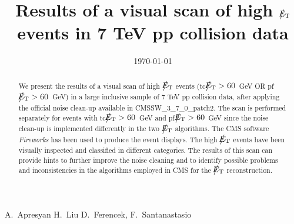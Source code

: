 \documentclass{cmspaper}
\def\etmiss{\big\slash\hspace{-1.6ex}{E_\text{T}}}
\begin{document}
\begin{linenumbers}


\begin{titlepage}


   \date{\today}

  \title{Results of a visual scan of high $\etmiss$ events in 7 TeV pp collision data}

  \begin{Authlist}
    A.~Apresyan
    H.~Liu
    D.~Ferencek, F.~Santanastasio %
  \end{Authlist}



  \begin{abstract}    
   We present the results of a visual scan of high $\etmiss$ events 
   (tc$\etmiss>60$~GeV OR pf$\etmiss>60$~GeV)
   in a large inclusive sample of 7 TeV pp collision data, 
   after applying the official noise clean-up available in CMSSW\_3\_7\_0\_patch2. 
   The scan is performed separately for events with tc$\etmiss>60$~GeV and pf$\etmiss>60$~GeV
   since the noise clean-up is implemented differently in the two $\etmiss$ algorithms.
   The CMS software {\it Fireworks} has been used to produce the event displays. 
   The high $\etmiss$ events have been visually inspected and classified in different 
   categories. The results of this scan can provide hints to further improve the noise 
   cleaning and to identify possible problems and inconsistencies in the algorithms employed 
   in CMS for the $\etmiss$ reconstruction.
  \end{abstract} 

  
\end{titlepage}

\setcounter{page}{2}%

\tableofcontents

\clearpage





\clearpage

\clearpage



\end{linenumbers}
\end{document}

